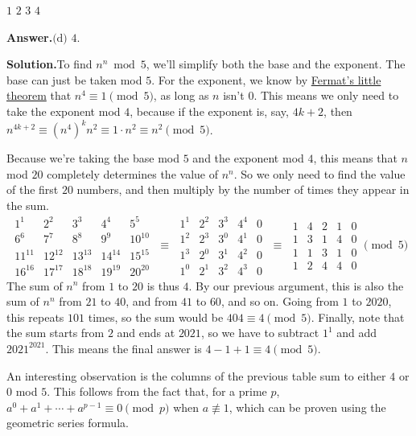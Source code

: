\documentclass[11pt,paper=letter]{scrartcl}
\newcommand{\ansb}[2]{{\sffamily \bfseries Answer.}\;\(\boxed{\text{(#1) #2}}\).}
\newcommand{\sol}{{\sffamily \bfseries Solution.}\;}
\newenvironment{rem}%
{\noindent \ignorespaces \small \sffamily \sansmath {\bfseries Remark.}}%
{\ignorespacesafterend}
\begin{document}
\begin{enumerate}[align=left,leftmargin=*]
\fourch
{$1$}
{$2$}
{$3$}
{$4$}

\ansb{d}{$4$}

\sol To find $n^n \bmod 5$, we'll simplify both the base and the exponent. The base can just be taken mod $5$. For the exponent, we know by \href{https://en.wikipedia.org/wiki/Fermat%27s_little_theorem}{Fermat's little theorem} that $n^4 \equiv 1 \pmod 5$, as long as $n$ isn't $0$. This means we only need to take the exponent mod $4$, because if the exponent is, say, $4k + 2$, then $n^{4k + 2} \equiv \left(n^4\right)^kn^2 \equiv 1 \cdot n^2 \equiv n^2 \pmod 5$.

Because we're taking the base mod $5$ and the exponent mod $4$, this means that $n$ mod $20$ completely determines the value of $n^n$. So we only need to find the value of the first $20$ numbers, and then multiply by the number of times they appear in the sum. \[
\begin{matrix}
1^1 & 2^2 & 3^3 & 4^4 & 5^5 \\
6^6 & 7^7 & 8^8 & 9^9 & 10^{10} \\
11^{11} & 12^{12} & 13^{13} & 14^{14} & 15^{15} \\
16^{16} & 17^{17} & 18^{18} & 19^{19} & 20^{20}
\end{matrix}
\;\equiv\;
\begin{matrix}
1^1 & 2^2 & 3^3 & 4^4 & 0 \\
1^2 & 2^3 & 3^0 & 4^1 & 0 \\
1^{3} & 2^{0} & 3^{1} & 4^{2} & 0 \\
1^{0} & 2^{1} & 3^{2} & 4^{3} & 0
\end{matrix}
\;\equiv\;
\begin{matrix}
1 & 4 & 2 & 1 & 0 \\
1 & 3 & 1 & 4 & 0 \\
1 & 1 & 3 & 1 & 0 \\
1 & 2 & 4 & 4 & 0
\end{matrix}
\pmod5
\]
The sum of $n^n$ from $1$ to $20$ is thus $4$. By our previous argument, this is also the sum of $n^n$ from $21$ to $40$, and from $41$ to $60$, and so on. Going from $1$ to $2020$, this repeats $101$ times, so the sum would be $404 \equiv 4 \pmod5$. Finally, note that the sum starts from $2$ and ends at $2021$, so we have to subtract $1^1$ and add $2021^{2021}$. This means the final answer is $4 - 1 + 1 \equiv 4 \pmod 5$.

\begin{rem}
An interesting observation is the columns of the previous table sum to either $4$ or $0$ mod $5$. This follows from the fact that, for a prime $p$, $a^0 + a^1 + \cdots + a^{p-1} \equiv 0 \pmod p$ when $a \not\equiv 1$, which can be proven using the geometric series formula.
\end{rem}


\end{enumerate}
\end{document}

